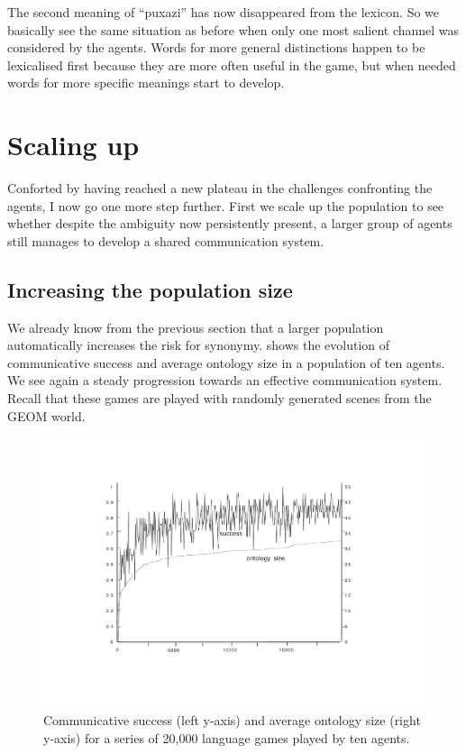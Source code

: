 The second meaning of ``puxazi'' has now disappeared
from the lexicon. So we basically see the same situation 
as before when only one most salient channel was
considered by the agents. Words for more general distinctions
happen to be lexicalised first because they are more 
often useful in the game, but when needed words for more specific
meanings start to develop. 

\section{Scaling up}

Conforted by having reached a new plateau in 
the challenges confronting the agents, I now go 
one more step further. First we scale up the 
population to see whether despite the ambiguity
now persistently present, a larger group of 
agents still manages to develop a shared
communication system. 

\subsection{Increasing the population size}

We already know from the previous section that 
a larger population automatically increases
the risk for synonymy.  shows the 
evolution of communicative success and average
ontology size in a population
of ten agents. We see again a steady progression
towards an effective communication system. Recall that 
these games are played with randomly generated scenes
from the GEOM world. 


\begin{figure}[htbp]
  \centerline{\includegraphics[width=.80\textwidth]{chap6/figs/agnt10}}
\caption{\label{agnt10} Communicative 
success (left y-axis) and average ontology size 
(right y-axis) for a series of 20,000 
language games played by ten agents.} 
\end{figure}

